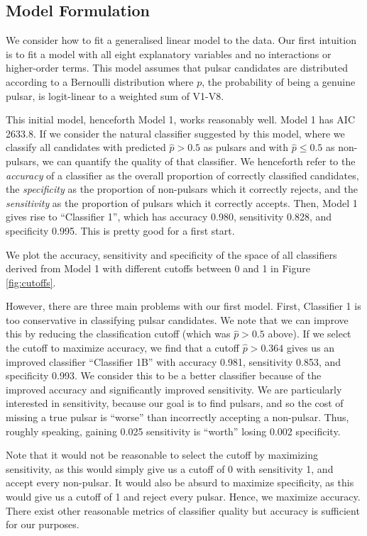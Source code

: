 \documentclass[11pt, oneside]{article}
\begin{document}
\subsection{Model Formulation}
\label{subsec:modelformulation}

We consider how to fit a generalised linear model to the data. Our first intuition is to fit a model with all eight explanatory variables and no interactions or higher-order terms. This model assumes that pulsar candidates are distributed according to a Bernoulli distribution where $p$, the probability of being a genuine pulsar, is logit-linear to a weighted sum of V1-V8. 

This initial model, henceforth Model 1, works reasonably well. Model 1 has AIC 2633.8. If we consider the natural classifier suggested by this model, where we classify all candidates with predicted $\hat{p} > 0.5$ as pulsars and with $\hat{p} \leq 0.5$ as non-pulsars, we can quantify the quality of that classifier. We henceforth refer to the \emph{accuracy} of a classifier as the overall proportion of correctly classified candidates, the \emph{specificity} as the proportion of non-pulsars which it correctly rejects, and the \emph{sensitivity} as the proportion of pulsars which it correctly accepts. Then, Model 1 gives rise to ``Classifier 1'', which has accuracy 0.980, sensitivity 0.828, and specificity 0.995.  This is pretty good for a first start. 

We plot the accuracy, sensitivity and specificity of the space of all classifiers derived from Model 1 with different cutoffs between 0 and 1 in Figure \ref{fig:cutoffs}.

However, there are three main problems with our first model. First, Classifier 1 is too conservative in classifying pulsar candidates. We note that we can improve this by reducing the classification cutoff (which was $\hat{p} > 0.5$ above). If we select the cutoff to maximize accuracy, we find that a cutoff $\hat{p} > 0.364$ gives us an improved classifier ``Classifier 1B'' with accuracy 0.981, sensitivity 0.853, and specificity 0.993. We consider this to be a better classifier because of the improved accuracy and significantly improved sensitivity. We are particularly interested in sensitivity, because our goal is to find pulsars, and so the cost of missing a true pulsar is ``worse'' than incorrectly accepting a non-pulsar. Thus, roughly speaking, gaining 0.025 sensitivity is ``worth'' losing 0.002 specificity. 

Note that it would not be reasonable to select the cutoff by maximizing sensitivity, as this would simply give us a cutoff of 0 with sensitivity 1, and accept every non-pulsar. It would also be absurd to maximize specificity, as this would give us a cutoff of 1 and reject every pulsar. Hence, we maximize accuracy. There exist other reasonable metrics of classifier quality but accuracy is sufficient for our purposes. 
\end{document}
